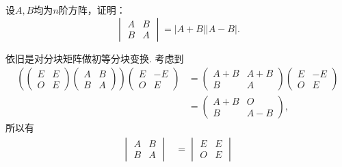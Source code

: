 \begin{exercise}
\begin{exgroup}
        \item 设$A,B$均为$n$阶方阵，证明：
        \[\begin{vmatrix}
                A & B \\ B & A
            \end{vmatrix} = |A+B||A-B|.\]
        \begin{answer}
            依旧是对分块矩阵做初等分块变换. 考虑到
            \begin{align*}
                \left(\begin{pmatrix}
                            E & E \\
                            O & E
                        \end{pmatrix}
                \begin{pmatrix}
                    A & B \\
                    B & A
                \end{pmatrix} \right)
                \begin{pmatrix}
                    E & -E \\
                    O & E
                \end{pmatrix}
                & = \begin{pmatrix}
                        A+B & A+B \\
                        B   & A
                    \end{pmatrix}
                \begin{pmatrix}
                    E & -E \\
                    O & E
                \end{pmatrix}      \\
                & = \begin{pmatrix}
                        A+B & O   \\
                        B   & A-B
                    \end{pmatrix},
            \end{align*}
            所以有 \begin{align*}
                \begin{vmatrix}
                    A & B \\
                    B & A
                \end{vmatrix}
                & = \begin{vmatrix}
                        E & E \\
                        O & E
                    \end{vmatrix}

\end{align*}
\end{answer}
\end{exgroup}
\end{exercise}
